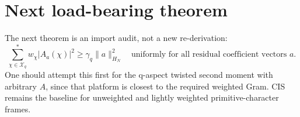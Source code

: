 \documentclass[11pt]{article}
\begin{document}
\section{Next load-bearing theorem}
The next theorem is an import audit, not a new re-derivation:
\[
\boxed{
\sum_{\chi\in\mathcal X_q}^{*} w_\chi |A_a(\chi)|^2
\ge \gamma_q\|a\|_{H_N}^2
\quad\text{uniformly for all residual coefficient vectors }a.
}
\]
One should attempt this first for the q-aspect twisted second moment with arbitrary $A$, since that platform is closest to the required weighted Gram.  CIS remains the baseline for unweighted and lightly weighted primitive-character frames.
\end{document}
